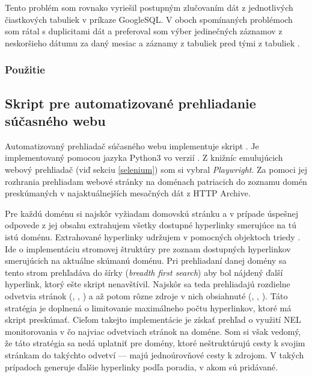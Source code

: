Tento problém som rovnako vyriešil postupným zlučovaním dát z jednotlivých čiastkových tabuliek v príkaze GoogleSQL.
V oboch spomínaných problémoch som rátal s duplicitami dát a preferoval som výber jedinečných záznamov z neskoršieho dátumu za daný mesiac a záznamy z tabuliek  pred tými z tabuliek .

\subsubsection{Použitie}


\subsection{Skript pre automatizované prehliadanie súčasného webu}

Automatizovaný prehliadač súčasného webu implementuje skript .
Je implementovaný pomocou jazyka Python3 vo verzií . Z knižníc emulujúcich webový 
prehliadač (viď sekciu \ref{selenium}) som si vybral \textit{Playwright}. 
Za pomoci jej rozhrania prehliadam webové stránky na doménach patriacich do zoznamu domén preskúmaných v najaktuálnejších mesačných dát z HTTP Archive.

Pre každú doménu si najskôr vyžiadam domovskú stránku a v prípade úspešnej odpovede z jej obsahu extrahujem všetky dostupné hyperlinky smerujúce na tú istú doménu.
Extrahované hyperlinky udržujem v pomocných objektoch triedy .
Ide o implementáciu stromovej štruktúry pre zoznam dostupných hyperlinkov smerujúcich na aktuálne skúmanú doménu. 
Pri prehliadaní danej domény sa tento strom prehľadáva do šírky (\textit{breadth first search}) aby bol nájdený ďalší hyperlink, ktorý ešte skript nenavštívil.
Najskôr sa teda prehliadajú rozdielne odvetvia stránok (, , ) a až potom rôzne zdroje v nich obsiahnuté (, , ).
Táto stratégia je doplnená o limitovanie maximálneho počtu hyperlinkov, ktoré má skript preskúmať.
Cieľom takejto implementácie je získať prehľad o využití NEL monitorovania v čo najviac odvetviach stránok na doméne.
Som si však vedomý, že táto stratégia sa nedá uplatniť pre domény, ktoré neštruktúrujú cesty k svojim stránkam do takýchto odvetví --- majú jednoúrovňové cesty k zdrojom.
V takých prípadoch generuje  ďalšie hyperlinky podľa poradia, v akom sú pridávané.

